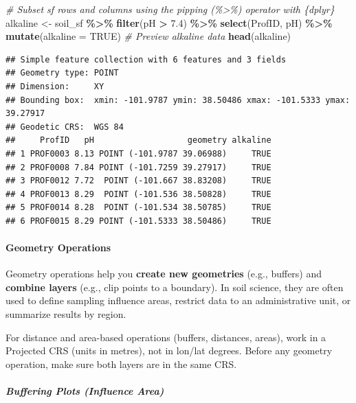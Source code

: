 \documentclass[
  10pt,
  b5paper,
  oneside]{book}
\newenvironment{Shaded}{\begin{snugshade}}{\end{snugshade}}
\newcommand{\AttributeTok}[1]{\textcolor[rgb]{0.13,0.29,0.53}{#1}}
\newcommand{\CommentTok}[1]{\textcolor[rgb]{0.56,0.35,0.01}{\textit{#1}}}
\newcommand{\ConstantTok}[1]{\textcolor[rgb]{0.56,0.35,0.01}{#1}}
\newcommand{\FloatTok}[1]{\textcolor[rgb]{0.00,0.00,0.81}{#1}}
\newcommand{\FunctionTok}[1]{\textcolor[rgb]{0.13,0.29,0.53}{\textbf{#1}}}
\newcommand{\NormalTok}[1]{#1}
\newcommand{\OtherTok}[1]{\textcolor[rgb]{0.56,0.35,0.01}{#1}}
\newcommand{\SpecialCharTok}[1]{\textcolor[rgb]{0.81,0.36,0.00}{\textbf{#1}}}
\begin{document}
\begin{Shaded}
\begin{Highlighting}[]
\CommentTok{\# Subset sf rows and columns using the pipping (\%\textgreater{}\%) operator with \{dplyr\}}
\NormalTok{alkaline }\OtherTok{\textless{}{-}}\NormalTok{ soil\_sf }\SpecialCharTok{\%\textgreater{}\%}
  \FunctionTok{filter}\NormalTok{(pH }\SpecialCharTok{\textgreater{}} \FloatTok{7.4}\NormalTok{) }\SpecialCharTok{\%\textgreater{}\%}
  \FunctionTok{select}\NormalTok{(ProfID, pH) }\SpecialCharTok{\%\textgreater{}\%}
  \FunctionTok{mutate}\NormalTok{(}\AttributeTok{alkaline =} \ConstantTok{TRUE}\NormalTok{)}
\CommentTok{\# Preview alkaline data}
\FunctionTok{head}\NormalTok{(alkaline)}
\end{Highlighting}
\end{Shaded}

\begin{verbatim}
## Simple feature collection with 6 features and 3 fields
## Geometry type: POINT
## Dimension:     XY
## Bounding box:  xmin: -101.9787 ymin: 38.50486 xmax: -101.5333 ymax: 39.27917
## Geodetic CRS:  WGS 84
##     ProfID   pH                   geometry alkaline
## 1 PROF0003 8.13 POINT (-101.9787 39.06988)     TRUE
## 2 PROF0008 7.84 POINT (-101.7259 39.27917)     TRUE
## 3 PROF0012 7.72  POINT (-101.667 38.83208)     TRUE
## 4 PROF0013 8.29  POINT (-101.536 38.50828)     TRUE
## 5 PROF0014 8.28  POINT (-101.534 38.50785)     TRUE
## 6 PROF0015 8.29 POINT (-101.5333 38.50486)     TRUE
\end{verbatim}

\paragraph*{Geometry Operations}\label{geometry-operations}

Geometry operations help you \textbf{create new geometries} (e.g., buffers) and \textbf{combine layers} (e.g., clip points to a boundary). In soil science, they are often used to define sampling influence areas, restrict data to an administrative unit, or summarize results by region.

For distance and area-based operations (buffers, distances, areas), work in a Projected CRS (units in metres), not in lon/lat degrees.
Before any geometry operation, make sure both layers are in the same CRS.

\subparagraph*{Buffering Plots (Influence Area)}\label{buffering-plots-influence-area}
\end{document}

